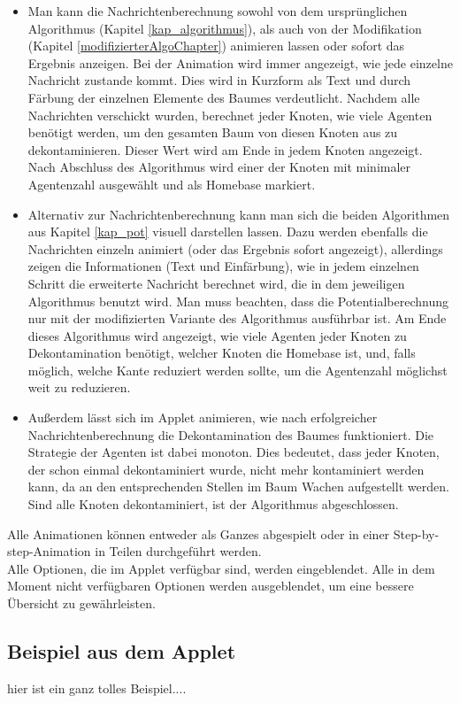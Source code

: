 \begin{itemize}
	\item Man kann die Nachrichtenberechnung sowohl von dem ursprünglichen Algorithmus (Kapitel \ref{kap_algorithmus}), als auch von der Modifikation (Kapitel \ref{modifizierterAlgoChapter}) animieren lassen oder sofort das Ergebnis anzeigen. Bei der Animation wird immer angezeigt, wie jede einzelne Nachricht zustande kommt. Dies wird in Kurzform als Text und durch Färbung der einzelnen Elemente des Baumes verdeutlicht. Nachdem alle Nachrichten verschickt wurden, berechnet jeder Knoten, wie viele Agenten benötigt werden, um den gesamten Baum von diesen Knoten aus zu dekontaminieren. Dieser Wert wird am Ende in jedem Knoten angezeigt. Nach Abschluss des Algorithmus wird einer der Knoten mit minimaler Agentenzahl ausgewählt und als Homebase markiert.
	
	\item Alternativ zur Nachrichtenberechnung kann man sich die beiden Algorithmen aus Kapitel \ref{kap_pot} visuell darstellen lassen. Dazu werden ebenfalls die Nachrichten einzeln animiert (oder das Ergebnis sofort angezeigt), allerdings zeigen die Informationen (Text und Einfärbung), wie in jedem einzelnen Schritt die erweiterte Nachricht berechnet wird, die in dem jeweiligen Algorithmus benutzt wird. Man muss beachten, dass die Potentialberechnung nur mit der modifizierten Variante des Algorithmus ausführbar ist. Am Ende dieses Algorithmus wird angezeigt, wie viele Agenten jeder Knoten zu Dekontamination benötigt, welcher Knoten die Homebase ist, und, falls möglich, welche Kante reduziert werden sollte, um die Agentenzahl möglichst weit zu reduzieren.
	
	\item Außerdem lässt sich im Applet animieren, wie nach erfolgreicher Nachrichtenberechnung die Dekontamination des Baumes funktioniert. Die Strategie der Agenten ist dabei monoton. Dies bedeutet, dass jeder Knoten, der schon einmal dekontaminiert wurde, nicht mehr kontaminiert werden kann, da an den entsprechenden Stellen im Baum Wachen aufgestellt werden. Sind alle Knoten dekontaminiert, ist der Algorithmus abgeschlossen.
\end{itemize}

Alle Animationen können entweder als Ganzes abgespielt oder in einer Step-by-step-Animation in Teilen durchgeführt werden. \\
Alle Optionen, die im Applet verfügbar sind, werden eingeblendet. Alle in dem Moment nicht verfügbaren Optionen werden ausgeblendet, um eine bessere Übersicht zu gewährleisten.


\subsection{Beispiel aus dem Applet}

hier ist ein ganz tolles Beispiel....